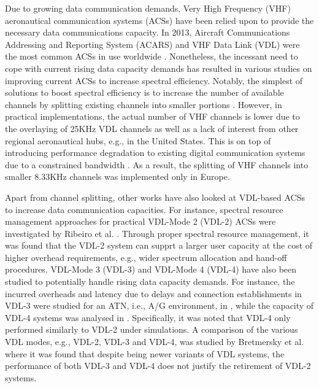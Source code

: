 Due to growing data communication demands, Very High Frequency (VHF) aeronautical communication systems (ACSs) have been relied upon to provide the necessary data communications capacity. In 2013, Aircraft Communications Addressing and Reporting System (ACARS) and VHF Data Link (VDL) were the most common ACSs in use worldwide \cite{neji2013survey}. Nonetheless, the incessant need to cope with current rising data capacity demands has resulted in various studies on improving current ACSs to increase spectral efficiency. Notably, the simplest of solutions to boost spectral efficiency is to increase the number of available channels by splitting existing channels into smaller portions \cite{jacobcognitive,stacey2008aeronautical}. However, in practical implementations, the actual number of VHF channels is lower due to the overlaying of 25KHz VDL channels as well as a lack of interest from other regional aeronautical hubs, e.g., in the United States. This is on top of introducing performance degradation to existing digital communication systems due to a constrained bandwidth \cite{neji2013survey}. As a result, the splitting of VHF channels into smaller 8.33KHz channels was implemented only in Europe. 

Apart from channel splitting, other works have also looked at VDL-based ACSs to increase data communication capacities. For instance, spectral resource management approaches for practical VDL-Mode 2 (VDL-2) ACSs were investigated by Ribeiro et al. \cite{ribeiro2014framework}. Through proper spectral resource management, it was found that the VDL-2 system can supprt a larger user capacity at the cost of higher overhead requirements, e.g., wider spectrum allocation and hand-off procedures. VDL-Mode 3 (VDL-3) and VDL-Mode 4 (VDL-4) have also been studied to potentially handle rising data capacity demands. For instance, the incurred overheads and latency due to delays and connection establishments in VDL-3 were studied for an ATN, i.e., A/G environment, in \cite{hung2000modeling}, \cite{hung2001enrouteModeling} while the capacity of VDL-4 systems was analysed in \cite{eurocontrol2010}. Specifically, it was noted that VDL-4 only performed similarly to VDL-2 under simulations. A comparison of the various VDL modes, e.g., VDL-2, VDL-3 and VDL-4, was studied by Bretmersky et al. \cite{bretmersky2002comparison} where it was found that despite being newer variants of VDL systems, the performance of both VDL-3 and VDL-4 does not justify the retirement of VDL-2 systems.

